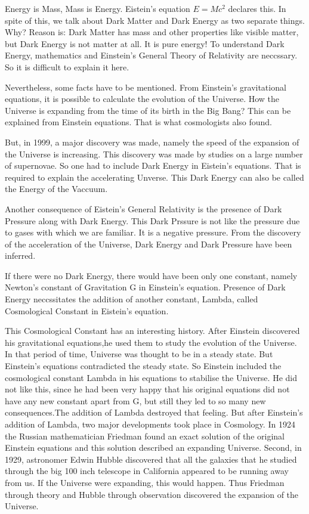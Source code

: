 Energy is Mass, Mass is Energy. Eistein's equation $E = Mc^{2}$
declares this. In spite of this, we talk about Dark Matter and
Dark Energy as two separate things. Why? Reason is: Dark Matter
has mass and other properties like visible matter, but Dark
Energy is not matter at all. It is pure energy!
To understand Dark Energy, mathematics and Einstein's General
Theory of Relativity are neccssary. So it is difficult to explain
it here.

Nevertheless, some facts have to be mentioned. From Einstein's
gravitational equations, it is possible to calculate the evolution
of the Universe. How the Universe is expanding from the time of
its birth in the Big Bang? This can be explained from Einstein
equations. That is what cosmologists also found.

But, in 1999, a major discovery was made, namely the speed of the
expansion of the Universe is increasing. This discovery was made
by studies on a large number of supernovae. So one had to include
Dark Energy in Eistein's equations. That is required to explain
the accelerating Unverse. This Dark Energy can also be called the
Energy of the Vaccuum.

Another consequence of Eistein's General Relativity is the presence
of Dark Pressure along with Dark Energy. This Dark Prssure is not
like the pressure due to gases with which we are familiar. It is
a negative pressure. From the discovery of the acceleration of the
Universe, Dark Energy and Dark Pressure have been inferred.

If there were no Dark Energy, there would have been only one constant,
namely Newton's constant of Gravitation G in Einstein's equation. Presence
of Dark Energy neccssitates the addition of another constant, Lambda,
called Cosmological Constant in Eistein's equation.

This Cosmological Constant has an interesting history. After Einstein
discovered his gravitational equations,he used them to study the
evolution of the Universe. In that period of time, Universe was
thought to be in a steady state. But Einstein's equations contradicted
the steady state. So Einstein included the cosmological constant Lambda
in his equations to stabilise the Universe. He did not like this, since
he had been very happy that his original equations did not have any new
constant apart from G, but still they led to so many new consequences.The addition of Lambda destroyed that feeling.
But after Einstein's addition of Lambda, two major developments took
place in Cosmology. In 1924 the Russian mathematician Friedman found an exact
solution of the original Einstein equations and this solution described
an expanding Universe. Second, in 1929, astronomer Edwin Hubble discovered
that all the galaxies that he studied through the big 100 inch telescope in
California appeared to be running away from us. If the Universe were
expanding, this would happen. Thus Friedman through theory and Hubble
through observation discovered the expansion of the Universe.

